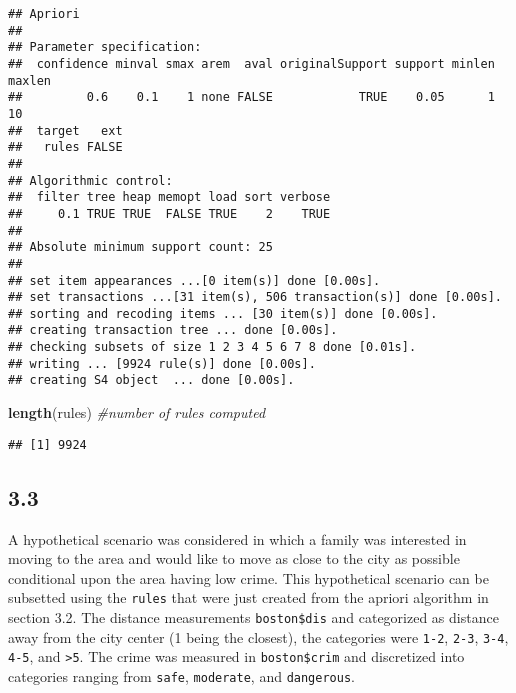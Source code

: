 \documentclass[]{article}
\newenvironment{Shaded}{\begin{snugshade}}{\end{snugshade}}
\newcommand{\KeywordTok}[1]{\textcolor[rgb]{0.13,0.29,0.53}{\textbf{{#1}}}}
\newcommand{\DataTypeTok}[1]{\textcolor[rgb]{0.13,0.29,0.53}{{#1}}}
\newcommand{\DecValTok}[1]{\textcolor[rgb]{0.00,0.00,0.81}{{#1}}}
\newcommand{\StringTok}[1]{\textcolor[rgb]{0.31,0.60,0.02}{{#1}}}
\newcommand{\CommentTok}[1]{\textcolor[rgb]{0.56,0.35,0.01}{\textit{{#1}}}}
\newcommand{\NormalTok}[1]{{#1}}
\begin{document}
\begin{verbatim}
## Apriori
## 
## Parameter specification:
##  confidence minval smax arem  aval originalSupport support minlen maxlen
##         0.6    0.1    1 none FALSE            TRUE    0.05      1     10
##  target   ext
##   rules FALSE
## 
## Algorithmic control:
##  filter tree heap memopt load sort verbose
##     0.1 TRUE TRUE  FALSE TRUE    2    TRUE
## 
## Absolute minimum support count: 25 
## 
## set item appearances ...[0 item(s)] done [0.00s].
## set transactions ...[31 item(s), 506 transaction(s)] done [0.00s].
## sorting and recoding items ... [30 item(s)] done [0.00s].
## creating transaction tree ... done [0.00s].
## checking subsets of size 1 2 3 4 5 6 7 8 done [0.01s].
## writing ... [9924 rule(s)] done [0.00s].
## creating S4 object  ... done [0.00s].
\end{verbatim}

\begin{Shaded}
\begin{Highlighting}[]
\KeywordTok{length}\NormalTok{(rules) }\CommentTok{#number of rules computed}
\end{Highlighting}
\end{Shaded}

\begin{verbatim}
## [1] 9924
\end{verbatim}

\subsection{3.3}\label{section-5}

A hypothetical scenario was considered in which a family was interested
in moving to the area and would like to move as close to the city as
possible conditional upon the area having low crime. This hypothetical
scenario can be subsetted using the \texttt{rules} that were just
created from the apriori algorithm in section 3.2. The distance
measurements \texttt{boston\$dis} and categorized as distance away from
the city center (1 being the closest), the categories were \texttt{1-2},
\texttt{2-3}, \texttt{3-4}, \texttt{4-5}, and \texttt{\textgreater{}5}.
The crime was measured in \texttt{boston\$crim} and discretized into
categories ranging from \texttt{safe}, \texttt{moderate}, and
\texttt{dangerous}.

\begin{Shaded}
\end{Shaded}
\end{document}
